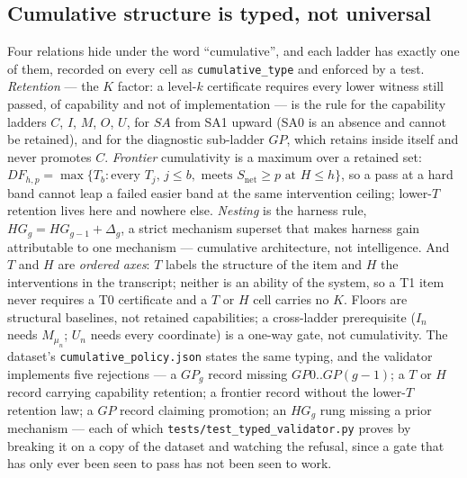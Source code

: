 \subsection{Cumulative structure is typed, not universal}\label{sec:typed}
Four relations hide under the word ``cumulative'', and each ladder has exactly one of them, recorded on every cell as \texttt{cumulative\_type} and enforced by a test. \emph{Retention} --- the $K$ factor: a level-$k$ certificate requires every lower witness still passed, of capability and not of implementation --- is the rule for the capability ladders $C$, $I$, $M$, $O$, $U$, for $SA$ from SA1 upward (SA0 is an absence and cannot be retained), and for the diagnostic sub-ladder $GP$, which retains inside itself and never promotes $C$. \emph{Frontier} cumulativity is a maximum over a retained set: $DF_{h,p} = \max\{T_b : \text{every } T_j,\, j \le b, \text{ meets } S_{\mathrm{net}} \ge p \text{ at } H \le h\}$, so a pass at a hard band cannot leap a failed easier band at the same intervention ceiling; lower-$T$ retention lives here and nowhere else. \emph{Nesting} is the harness rule, $HG_g = HG_{g-1} + \Delta_g$, a strict mechanism superset that makes harness gain attributable to one mechanism --- cumulative architecture, not intelligence. And $T$ and $H$ are \emph{ordered axes}: $T$ labels the structure of the item and $H$ the interventions in the transcript; neither is an ability of the system, so a T1 item never requires a T0 certificate and a $T$ or $H$ cell carries no $K$. Floors are structural baselines, not retained capabilities; a cross-ladder prerequisite ($I_n$ needs $M_{\mu_n}$; $U_n$ needs every coordinate) is a one-way gate, not cumulativity. The dataset's \texttt{cumulative\_policy.json} states the same typing, and the validator implements five rejections --- a $GP_g$ record missing $GP0..GP(g{-}1)$; a $T$ or $H$ record carrying capability retention; a frontier record without the lower-$T$ retention law; a $GP$ record claiming promotion; an $HG_g$ rung missing a prior mechanism --- each of which \texttt{tests/test\_typed\_validator.py} proves by breaking it on a copy of the dataset and watching the refusal, since a gate that has only ever been seen to pass has not been seen to work.

